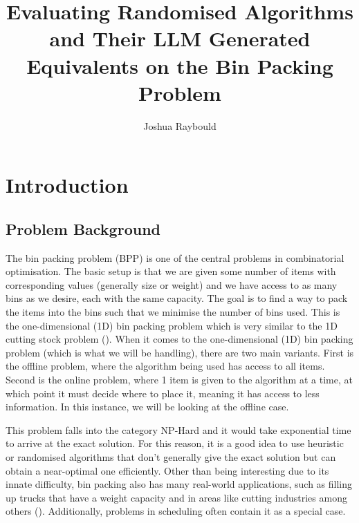 \documentclass[12pt]{article}
\title{Evaluating Randomised Algorithms and Their LLM Generated Equivalents on the Bin Packing Problem}
\author{Joshua Raybould}
\begin{document}
\maketitle

\section{Introduction}

\subsection{Problem Background}

The bin packing problem (BPP) is one of the central problems in combinatorial optimisation. The basic setup is that we are given some number of items with corresponding values (generally size or weight) and we have access to as many bins as we desire, each with the same capacity. The goal is to find a way to pack the items into the bins such that we minimise the number of bins used. This is the one-dimensional (1D) bin packing problem which is very similar to the 1D cutting stock problem (\cite{maxence}). When it comes to the one-dimensional (1D) bin packing problem (which is what we will be handling), there are two main variants. First is the offline problem, where the algorithm being used has access to all items. Second is the online problem, where 1 item is given to the algorithm at a time, at which point it must decide where to place it, meaning it has access to less information. In this instance, we will be looking at the offline case.  

This problem falls into the category NP-Hard and it would take exponential time to arrive at the exact solution. For this reason, it is a good idea to use heuristic or randomised algorithms that don't generally give the exact solution but can obtain a near-optimal one efficiently. Other than being interesting due to its innate difficulty, bin packing also has many real-world applications, such as filling up trucks that have a weight capacity and in areas like cutting industries among others (\cite{munien}). Additionally, problems in scheduling often contain it as a special case. 
\end{document}
